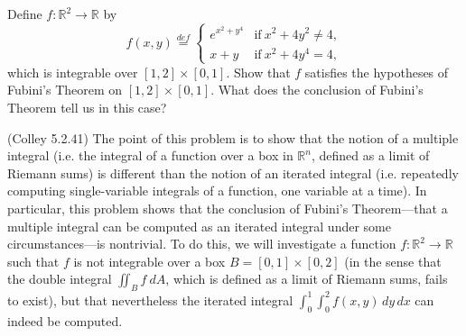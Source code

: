 \documentclass[11pt,letterpaper,cm]{nupset}
\begin{document}
\begin{problem}[Exercise 4] Define $f:\mathbb{R}^2\to\mathbb{R}$ by $$f(x,y)\stackrel{def}{=}\begin{cases} e^{x^2+y^4} & \mbox{if}\ x^2+4y^2\neq 4,\\ x+y & \mbox{if}\ x^2+4y^4=4,\end{cases}$$ which is integrable over $[1,2]\times [0,1]$.  Show that $f$ satisfies the hypotheses of Fubini's Theorem on $[1,2]\times[0,1]$.  What does the conclusion of Fubini's Theorem tell us in this case?
\end{problem}
\begin{solution}
\end{solution}
\newpage

\begin{problem}[Exercise 5] (Colley 5.2.41) 
	The point of this problem is to show that the notion of a multiple integral (i.e. the integral of a function over a box in $\mathbb{R}^n$, defined as a limit of Riemann sums) is different than the notion of an iterated integral (i.e. repeatedly computing single-variable integrals of a function, one variable at a time).  In particular, this problem shows that the conclusion of Fubini's Theorem---that a multiple integral can be computed as an iterated integral under some circumstances---is nontrivial.  To do this, we will investigate a function $f:\mathbb{R}^2\to\mathbb{R}$ such that $f$ is not integrable over a box $B=[0,1]\times[0,2]$ (in the sense that the double integral $\iint_B f\ dA$, which is defined as a limit of Riemann sums, fails to exist), but that nevertheless the iterated integral $\int_0^1\int_0^2 f(x,y)\,dy\, dx$ can indeed be computed.
	\medskip
	

\end{problem}
\end{document}
